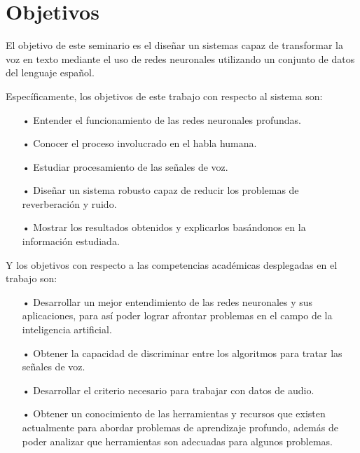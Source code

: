 
\section{Objetivos}

El objetivo de este seminario es el diseñar un sistemas capaz de transformar la voz en texto mediante el uso de redes neuronales utilizando un conjunto de datos del lenguaje español.

Específicamente, los objetivos de este trabajo con respecto al sistema son:

\begin{itemize}
\item[•] Entender el funcionamiento de las redes neuronales profundas.%
\item[•] Conocer el proceso involucrado en el habla humana.
\item[•] Estudiar procesamiento de las señales de voz.

\item[•] Diseñar un sistema robusto capaz de reducir los problemas de reverberación y ruido.
\item[•] Mostrar los resultados obtenidos y explicarlos basándonos en la información estudiada.



\end{itemize}

Y los objetivos con respecto a las competencias académicas desplegadas en el trabajo son:
\begin{itemize}
\item[•] Desarrollar un mejor entendimiento de las redes neuronales y sus aplicaciones, para así poder lograr afrontar problemas en el campo de la inteligencia artificial. %
\item[•] Obtener la capacidad de discriminar entre los algoritmos para tratar las señales de voz.%
\item[•] Desarrollar el criterio necesario para trabajar con datos de audio.
\item[•] Obtener un conocimiento de las herramientas y recursos que existen actualmente para abordar problemas de aprendizaje profundo, además de poder analizar que herramientas son adecuadas para algunos problemas.

\end{itemize}

